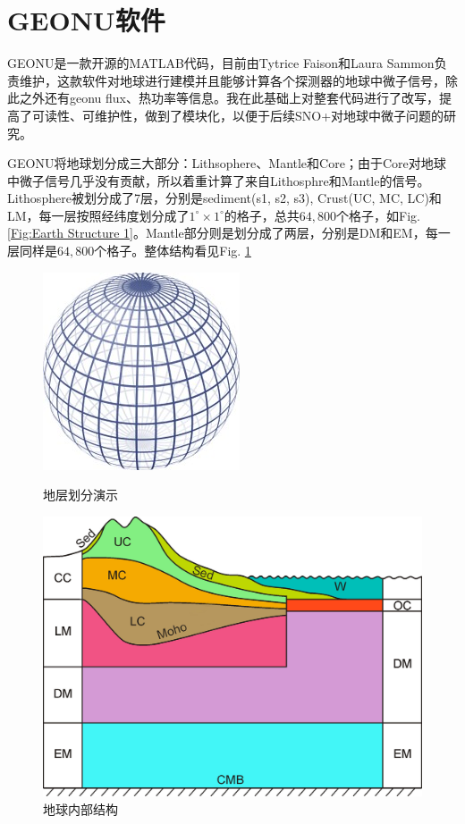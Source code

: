 		\section{GEONU软件}
			GEONU是一款开源的MATLAB代码，目前由Tytrice Faison和Laura Sammon负责维护\cite{Original_GEONU}，这款软件对地球进行建模并且能够计算各个探测器的地球中微子信号，除此之外还有geonu flux、热功率等信息。我在此基础上对整套代码进行了改写，提高了可读性、可维护性，做到了模块化，以便于后续SNO+对地球中微子问题的研究。\par
			GEONU将地球划分成三大部分：Lithsophere、Mantle和Core；由于Core对地球中微子信号几乎没有贡献，所以着重计算了来自Lithosphre和Mantle的信号。Lithosphere被划分成了7层，分别是sediment(s1, s2, s3), Crust(UC, MC, LC)和LM，每一层按照经纬度划分成了$1^\circ \times 1^\circ$的格子，总共$64,800$个格子，如Fig. \ref{Fig:Earth Structure 1}。Mantle部分则是划分成了两层，分别是DM和EM，每一层同样是$64,800$个格子。整体结构看见Fig. \ref{Fig:Earth Structure 2}
				\begin{figure}[H]
					\centering
					\begin{minipage}{0.49\linewidth}
						\centering
						\includegraphics[width=0.6\linewidth]{./Pics/Earth_Structure_1.jpg}
						\caption{地层划分演示}
						\label{Fig:Earth Structure 1}
					\end{minipage}
					\begin{minipage}{0.49\linewidth}
						\center
						\includegraphics[width=0.8\linewidth]{./Pics/Earth_Structure_2.jpg}
						\caption{地球内部结构\cite{huang2013reference}}
						\label{Fig:Earth Structure 2}
					\end{minipage}
				\end{figure}
